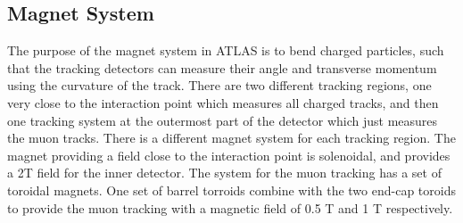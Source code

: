 \subsection{Magnet System}

The purpose of the magnet system in ATLAS is to bend charged particles, such that the tracking detectors can measure their angle and transverse momentum using the curvature of the track. 
There are two different tracking regions, one very close to the interaction point which measures all charged tracks, and then one tracking system at the outermost part of the detector which just measures the muon tracks. 
There is a different magnet system for each tracking region.
The magnet providing a field close to the interaction point is solenoidal, and provides a 2T field for the inner detector. 
The system for the muon tracking has a set of toroidal magnets.
One set of barrel torroids combine with the two end-cap toroids to provide the muon tracking with a magnetic field of 0.5 T and 1 T respectively.

